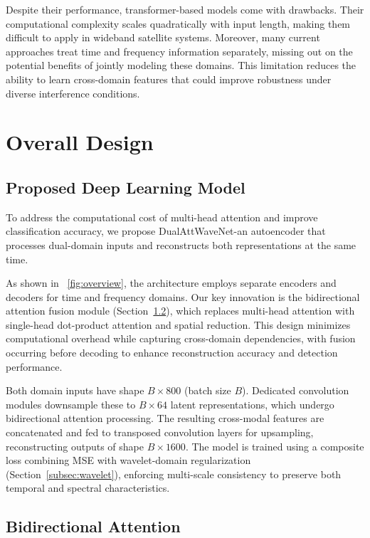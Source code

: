 \documentclass[conference]{IEEEtran}
\begin{document}
Despite their performance, transformer-based models come with drawbacks. Their computational complexity scales quadratically with input length, making them difficult to apply in wideband satellite systems. Moreover, many current approaches treat time and frequency information separately, missing out on the potential benefits of jointly modeling these domains. This limitation reduces the ability to learn cross-domain features that could improve robustness under diverse interference conditions.

\section{Overall Design}
\label{sec:model}


\subsection{Proposed Deep Learning Model}
\label{subsec:proposed_model}

To address the computational cost of multi-head attention and improve classification accuracy, we propose DualAttWaveNet-an autoencoder that processes dual-domain inputs and reconstructs both representations at the same time.

As shown in \figurename~\ref{fig:overview}, the architecture employs separate encoders and decoders for time and frequency domains. Our key innovation is the bidirectional attention fusion module (Section~\ref{subsec:bi_attn}), which replaces multi-head attention with single-head dot-product attention and spatial reduction. This design minimizes computational overhead while capturing cross-domain dependencies, with fusion occurring before decoding to enhance reconstruction accuracy and detection performance.

Both domain inputs have shape $B \times 800$ (batch size $B$). Dedicated convolution modules downsample these to $B \times 64$ latent representations, which undergo bidirectional attention processing. The resulting cross-modal features are concatenated and fed to transposed convolution layers for upsampling, reconstructing outputs of shape $B \times 1600$. The model is trained using a composite loss combining MSE with wavelet-domain regularization (Section~\ref{subsec:wavelet}), enforcing multi-scale consistency to preserve both temporal and spectral characteristics.

\subsection{Bidirectional Attention}
\label{subsec:bi_attn}
\end{document}
